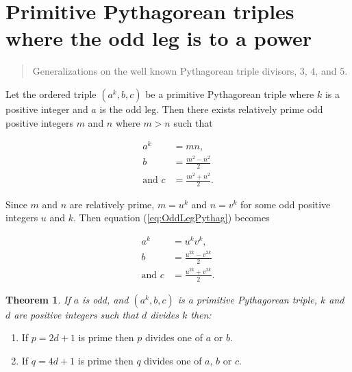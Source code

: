 \documentclass{article}
\newtheorem{theorem}{Theorem}
\theoremstyle{definition}
\begin{document}
\section{Primitive Pythagorean triples where the odd leg is to a power}

\begin{quote}
\textsf{Generalizations on the well known Pythagorean triple divisors, \(3\), \(4\), and \(5\).}
\end{quote}

Let the ordered triple \((a^k,b,c)\) be a primitive Pythagorean triple where \(k\) is a positive integer and \(a\) is the odd leg. Then there exists relatively prime odd positive integers \(m\) and \(n\) where \(m > n\) such that

\begin{equation}
\begin{aligned}
a^k &= mn, \\
b &= \frac{m^2 - n^2}{2} \\
\text{and } c &= \frac{m^2 + n^2}{2}.
\end{aligned}
\label{eq:OddLegPythag}
\end{equation}

Since \(m\) and \(n\) are relatively prime, \(m=u^k\) and \(n=v^k\) for some odd positive integers \(u\) and \(k\). Then equation (\ref{eq:OddLegPythag}) becomes

\begin{equation}
\begin{aligned}
a^k &= u^kv^k, \\
b &= \frac{u^{2k} - v^{2k}}{2} \\
\text{and } c &= \frac{u^{2k} + v^{2k}}{2}.
\end{aligned}
\label{eq:OddLegPower}
\end{equation}

\begin{theorem}
If \(a\) is odd, and \((a^k,b,c)\) is a primitive Pythagorean triple, \(k\) and \(d\) are positive integers such that \(d\) divides \(k\) then:
\end{theorem}
\begin{enumerate}
\item If \(p=2d+1\) is prime then \(p\) divides one of \(a\) or \(b\).
\item If \(q=4d+1\) is prime then \(q\) divides one of \(a\), \(b\) or \(c\).
\end{enumerate}
\end{document}
